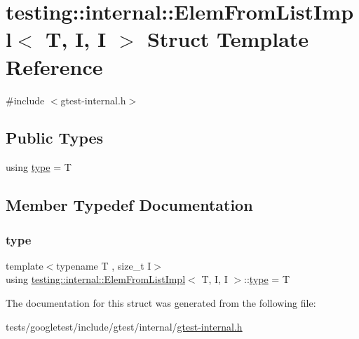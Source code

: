 \hypertarget{structtesting_1_1internal_1_1ElemFromListImpl_3_01T_00_01I_00_01I_01_4}{}\section{testing\+:\+:internal\+:\+:Elem\+From\+List\+Impl$<$ T, I, I $>$ Struct Template Reference}
\label{structtesting_1_1internal_1_1ElemFromListImpl_3_01T_00_01I_00_01I_01_4}


{\ttfamily \#include $<$gtest-\/internal.\+h$>$}

\subsection*{Public Types}
\begin{DoxyCompactItemize}
\item 
using \hyperlink{structtesting_1_1internal_1_1ElemFromListImpl_3_01T_00_01I_00_01I_01_4_ab1552e339cc1ff1e0aa448d684ffaf39}{type} = T
\end{DoxyCompactItemize}


\subsection{Member Typedef Documentation}
\mbox{\label{structtesting_1_1internal_1_1ElemFromListImpl_3_01T_00_01I_00_01I_01_4_ab1552e339cc1ff1e0aa448d684ffaf39}} 
\subsubsection{\texorpdfstring{type}{type}}
{\footnotesize\ttfamily template$<$typename T , size\+\_\+t I$>$ \\
using \hyperlink{structtesting_1_1internal_1_1ElemFromListImpl}{testing\+::internal\+::\+Elem\+From\+List\+Impl}$<$ T, I, I $>$\+::\hyperlink{structtesting_1_1internal_1_1ElemFromListImpl_3_01T_00_01I_00_01I_01_4_ab1552e339cc1ff1e0aa448d684ffaf39}{type} =  T}



The documentation for this struct was generated from the following file\+:\begin{DoxyCompactItemize}
\item 
tests/googletest/include/gtest/internal/\hyperlink{gtest-internal_8h}{gtest-\/internal.\+h}\end{DoxyCompactItemize}
